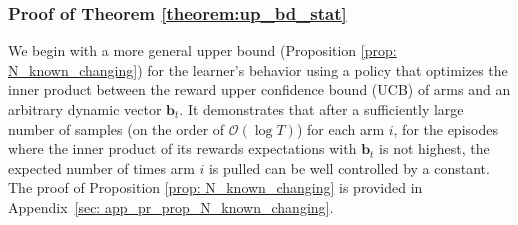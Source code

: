 






\subsubsection{Proof of Theorem \ref{theorem:up_bd_stat}}
\label{sec:app_pr_up_bd_stat}

We begin with a more general upper bound (Proposition \ref{prop: N_known_changing}) for the learner's behavior using a policy that optimizes the inner product between the reward upper confidence bound (UCB) of arms and an arbitrary dynamic vector $\boldsymbol{b}_t$. It demonstrates that after a sufficiently large number of samples (on the order of $\mathcal{O}(\log T)$) for each arm $i$, for the episodes where the inner product of its rewards expectations with $\boldsymbol{b}_t$ is not highest, the expected number of times arm $i$ is pulled can be well controlled by a constant.
The proof of Proposition \ref{prop: N_known_changing} is provided in Appendix~\ref{sec: app_pr_prop_N_known_changing}.


